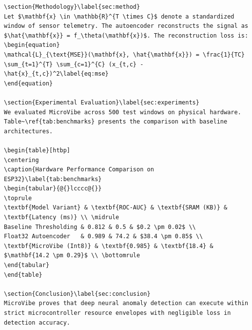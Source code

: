 \begin{lstlisting}[style=pythonstyle, caption={Complete Minimal \LaTeX{} Template for an Experimental TinyML Paper.}, label={lst:minimal_paper_tex}]
\section{Methodology}\label{sec:method}
Let $\mathbf{x} \in \mathbb{R}^{T \times C}$ denote a standardized window of sensor telemetry. The autoencoder reconstructs the signal as $\hat{\mathbf{x}} = f_\theta(\mathbf{x})$. The reconstruction loss is:
\begin{equation}
\mathcal{L}_{\text{MSE}}(\mathbf{x}, \hat{\mathbf{x}}) = \frac{1}{TC} \sum_{t=1}^{T} \sum_{c=1}^{C} (x_{t,c} - \hat{x}_{t,c})^2\label{eq:mse}
\end{equation}

\section{Experimental Evaluation}\label{sec:experiments}
We evaluated MicroVibe across 500 test windows on physical hardware. Table~\ref{tab:benchmarks} presents the comparison with baseline architectures.

\begin{table}[htbp]
\centering
\caption{Hardware Performance Comparison on ESP32}\label{tab:benchmarks}
\begin{tabular}{@{}lcccc@{}}
\toprule
\textbf{Model Variant} & \textbf{ROC-AUC} & \textbf{SRAM (KB)} & \textbf{Latency (ms)} \\ \midrule
Baseline Thresholding & 0.812 & 0.5 & $0.2 \pm 0.02$ \\
Float32 Autoencoder   & 0.989 & 74.2 & $38.4 \pm 0.85$ \\
\textbf{MicroVibe (Int8)} & \textbf{0.985} & \textbf{18.4} & $\mathbf{14.2 \pm 0.29}$ \\ \bottomrule
\end{tabular}
\end{table}

\section{Conclusion}\label{sec:conclusion}
MicroVibe proves that deep neural anomaly detection can execute within strict microcontroller resource envelopes with negligible loss in detection accuracy.




\end{lstlisting}

